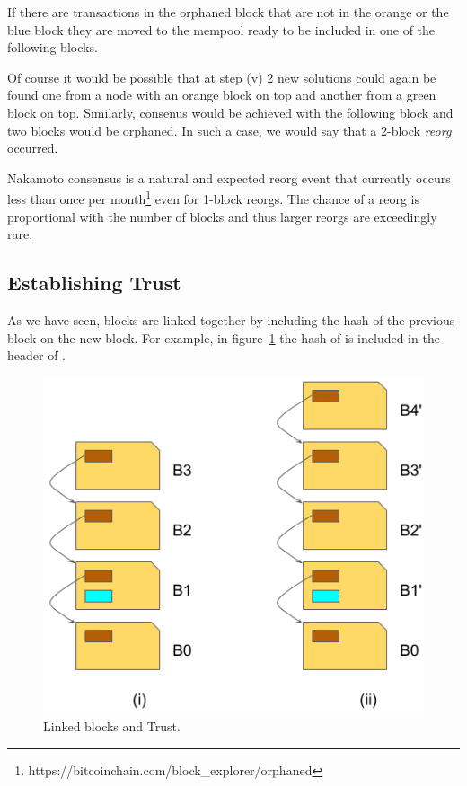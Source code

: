 \vspace{3em}
\begin{note}
If there are transactions in the orphaned block that are not in the orange or the blue block they are moved to the mempool ready to be included in one of the following blocks.
\end{note}

Of course it would be possible that at step (v) 2 new solutions could again be found one from a node with an orange block on top and another from a green block on top. Similarly, consenus would be achieved with the following block and two blocks would be orphaned. In such a case, we would say that a 2-block \emph{reorg} occurred.

Nakamoto consensus is a natural and expected reorg event that currently occurs less than once per month\footnote{https://bitcoinchain.com/block\_explorer/orphaned} even for 1-block reorgs. The chance of a reorg is proportional with the number of blocks and thus larger reorgs are exceedingly rare.

\subsection*{Establishing Trust}
As we have seen, blocks are linked together by including the hash of the previous block on the new block. For example, in figure~\ref{fig:blockchain-trust} the hash of  is included in the header of .

\begin{figure}[h]
\begin{center}
\includegraphics[scale=0.5]{images/blockchain-trust}
\caption{Linked blocks and Trust.}
\label{fig:blockchain-trust}
\end{center}
\end{figure}

